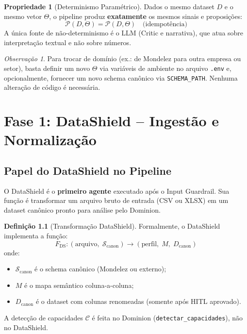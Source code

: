 \documentclass[a4paper, 12pt]{report}
\theoremstyle{definition}
\newtheorem{definicao}{Defini\c{c}\~ao}[chapter]
\newtheorem{propriedade}{Propriedade}[chapter]
\theoremstyle{remark}
\newtheorem{observacao}{Observa\c{c}\~ao}[chapter]
\begin{document}
\begin{propriedade}[Determinismo Param\'etrico]
  Dados o mesmo dataset $D$ e o mesmo vetor $\Theta$, o pipeline
  produz \textbf{exatamente} os mesmos sinais e proposi\c{c}\~oes:
  \[
    \mathcal{P}(D, \Theta) = \mathcal{P}(D, \Theta) \quad \text{(idempot\^encia)}
  \]
  A \'unica fonte de n\~ao-determinismo \'e o LLM (Critic e narrativa),
  que atua sobre interpreta\c{c}\~ao textual e n\~ao sobre n\'umeros.
\end{propriedade}

\begin{observacao}
  Para trocar de dom\'inio (ex.: de Mondelez para outra empresa ou setor),
  basta definir um novo $\Theta$ via vari\'aveis de ambiente no arquivo
  \texttt{.env} e, opcionalmente, fornecer um novo schema can\^onico
  via \texttt{SCHEMA\_PATH}. Nenhuma altera\c{c}\~ao de c\'odigo \'e necess\'aria.
\end{observacao}


\chapter{Fase 1: DataShield -- Ingest\~ao e Normaliza\c{c}\~ao}

\section{Papel do DataShield no Pipeline}

O DataShield \'e o \textbf{primeiro agente} executado ap\'os o Input Guardrail.
Sua fun\c{c}\~ao \'e transformar um arquivo bruto de entrada (CSV ou XLSX)
em um dataset can\^onico pronto para an\'alise pelo Dominion.

\begin{definicao}[Transforma\c{c}\~ao DataShield]
  Formalmente, o DataShield implementa a fun\c{c}\~ao:
  \[
    F_{\text{DS}} : (\text{arquivo},\; \mathcal{S}_{\text{canon}}) \to
    (\text{perfil},\; M,\; D_{\text{canon}})
  \]
  onde:
  \begin{itemize}
    \item $\mathcal{S}_{\text{canon}}$ \'e o schema can\^onico (Mondelez ou externo);
    \item $M$ \'e o mapa sem\^antico coluna-a-coluna;
    \item $D_{\text{canon}}$ \'e o dataset com colunas renomeadas
      (somente ap\'os HITL aprovado).
  \end{itemize}
  A detec\c{c}\~ao de capacidades $\mathcal{C}$ \'e feita no Dominion
  (\texttt{detectar\_capacidades}), n\~ao no DataShield.
\end{definicao}
\end{document}
